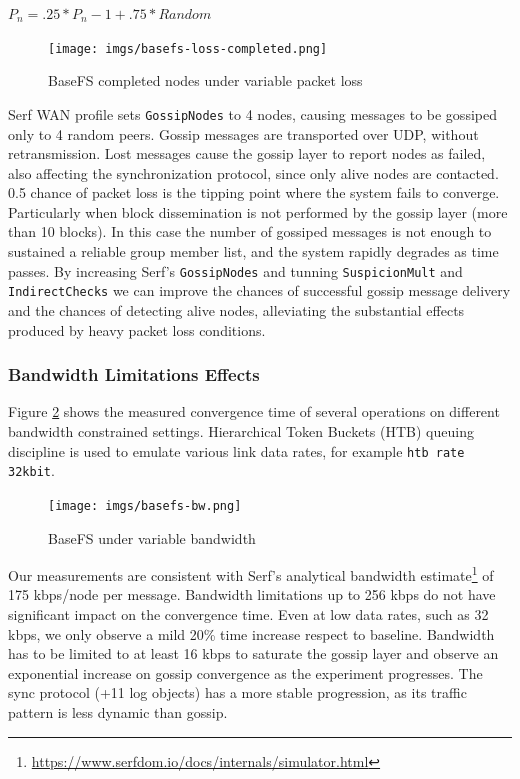 \documentclass{sig-alternate}
\begin{document}
$P_n = .25 * P_n-1 + .75 * Random$



\begin{figure}
\centering
\texttt{[image: imgs/basefs-loss-completed.png]}
\caption{BaseFS completed nodes under variable packet loss}
\label{fig:basefs-loss-completed}
\end{figure}


Serf WAN profile sets \texttt{GossipNodes} to 4 nodes, causing messages to be gossiped only to 4 random peers. Gossip messages are transported over UDP, without retransmission. Lost messages cause the gossip layer to report nodes as failed, also affecting the synchronization protocol, since only alive nodes are contacted. 0.5 chance of packet loss is the tipping point where the system fails to converge. Particularly when block dissemination is not performed by the gossip layer (more than 10 blocks). In this case the number of gossiped messages is not enough to sustained a reliable group member list, and the system rapidly degrades as time passes. By increasing Serf's \texttt{GossipNodes} and tunning \texttt{SuspicionMult} and \texttt{IndirectChecks} we can improve the chances of successful gossip message delivery and the chances of detecting alive nodes, alleviating the substantial effects produced by heavy packet loss conditions.


\subsubsection{Bandwidth Limitations Effects}

Figure \ref{fig:basefs-bw} shows the measured convergence time of several operations on different bandwidth constrained settings. Hierarchical Token Buckets (HTB) queuing discipline is used to emulate various link data rates, for example \texttt{htb rate 32kbit}.

\begin{figure}
\centering
\texttt{[image: imgs/basefs-bw.png]}
\caption{BaseFS under variable bandwidth}
\label{fig:basefs-bw}
\end{figure}

Our measurements are consistent with Serf's analytical bandwidth estimate\footnote{\url{https://www.serfdom.io/docs/internals/simulator.html}} of 175 kbps/node per message. Bandwidth limitations up to 256 kbps do not have significant impact on the convergence time. Even at low data rates, such as 32 kbps, we only observe a mild 20\% time increase respect to baseline. Bandwidth has to be limited to at least 16 kbps to saturate the gossip layer and observe an exponential increase on gossip convergence as the experiment progresses. The sync protocol (+11 log objects) has a more stable progression, as its traffic pattern is less dynamic than gossip.
\end{document}
